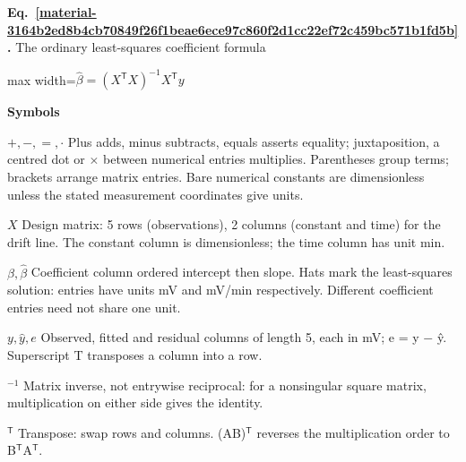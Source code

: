 \documentclass[11pt,a4paper]{article}
\begin{document}
\par\medskip
\noindent\begin{minipage}{\linewidth}
\label{material-3164b2ed8b4cb70849f26f1beae6ece97c860f2d1cc22ef72c459bc571b1fd5b}
\noindent\textbf{Eq.~\ref*{material-3164b2ed8b4cb70849f26f1beae6ece97c860f2d1cc22ef72c459bc571b1fd5b}.} The ordinary least-squares coefficient formula\par\nopagebreak
\begin{center}\begin{adjustbox}{max width=\linewidth}$\displaystyle \boxed{\widehat\beta=(X^{\mathsf T}X)^{-1}X^{\mathsf T}y}$\end{adjustbox}\end{center}

\par\noindent\textbf{Symbols}

\par\noindent\textbf{\(+,-,=,\cdot\)} Plus adds, minus subtracts, equals asserts equality; juxtaposition, a centred dot or \ensuremath{\times} between numerical entries multiplies. Parentheses group terms; brackets arrange matrix entries. Bare numerical constants are dimensionless unless the stated measurement coordinates give units.

\par\noindent\textbf{\(X\)} Design matrix: 5 rows (observations), 2 columns (constant and time) for the drift line. The constant column is dimensionless; the time column has unit min.

\par\noindent\textbf{\(\beta,\widehat\beta\)} Coefficient column ordered intercept then slope. Hats mark the least-squares solution: entries have units mV and mV/min respectively. Different coefficient entries need not share one unit.

\par\noindent\textbf{\(y,\widehat y,e\)} Observed, fitted and residual columns of length 5, each in mV; e = y \ensuremath{-} ŷ. Superscript T transposes a column into a row.

\par\noindent\textbf{\({}^{-1}\)} Matrix inverse, not entrywise reciprocal: for a nonsingular square matrix, multiplication on either side gives the identity.

\par\noindent\textbf{\({}^{\mathsf T}\)} Transpose: swap rows and columns. (AB)\ensuremath{{}^{\mathsf T}} reverses the multiplication order to B\ensuremath{{}^{\mathsf T}}A\ensuremath{{}^{\mathsf T}}.

\end{minipage}\par
\medskip
\end{document}

